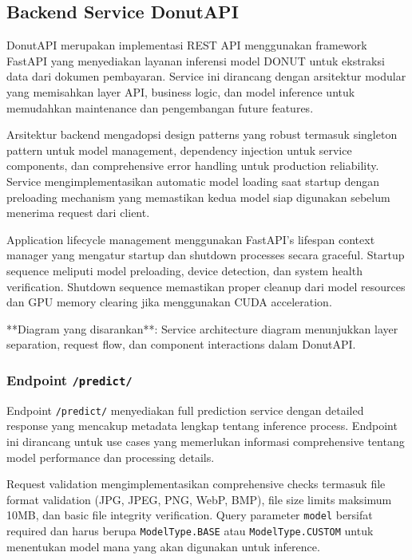 \subsection{Backend Service DonutAPI}
\label{subsec:backend-service-donutapi}

DonutAPI merupakan implementasi REST API menggunakan framework FastAPI yang menyediakan layanan inferensi model DONUT untuk ekstraksi data dari dokumen pembayaran. Service ini dirancang dengan arsitektur modular yang memisahkan layer API, business logic, dan model inference untuk memudahkan maintenance dan pengembangan future features.

Arsitektur backend mengadopsi design patterns yang robust termasuk singleton pattern untuk model management, dependency injection untuk service components, dan comprehensive error handling untuk production reliability. Service mengimplementasikan automatic model loading saat startup dengan preloading mechanism yang memastikan kedua model siap digunakan sebelum menerima request dari client.

Application lifecycle management menggunakan FastAPI's lifespan context manager yang mengatur startup dan shutdown processes secara graceful. Startup sequence meliputi model preloading, device detection, dan system health verification. Shutdown sequence memastikan proper cleanup dari model resources dan GPU memory clearing jika menggunakan CUDA acceleration.

**Diagram yang disarankan**: Service architecture diagram menunjukkan layer separation, request flow, dan component interactions dalam DonutAPI.

\subsubsection{Endpoint \texttt{/predict/}}
\label{subsubsec:endpoint-predict-full}

Endpoint \texttt{/predict/} menyediakan full prediction service dengan detailed response yang mencakup metadata lengkap tentang inference process. Endpoint ini dirancang untuk use cases yang memerlukan informasi comprehensive tentang model performance dan processing details.

Request validation mengimplementasikan comprehensive checks termasuk file format validation (JPG, JPEG, PNG, WebP, BMP), file size limits maksimum 10MB, dan basic file integrity verification. Query parameter \texttt{model} bersifat required dan harus berupa \texttt{ModelType.BASE} atau \texttt{ModelType.CUSTOM} untuk menentukan model mana yang akan digunakan untuk inference.

